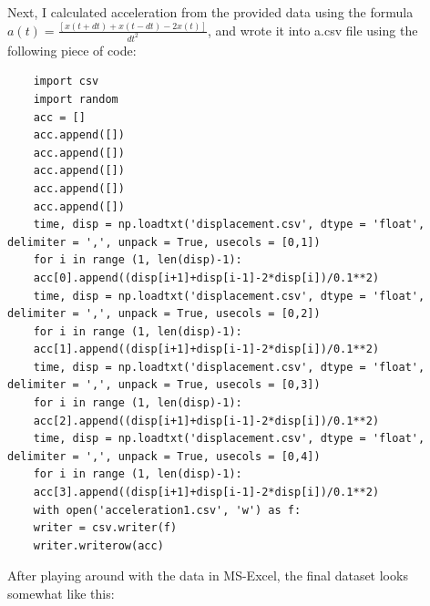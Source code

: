 \documentclass{article}
\begin{document}
\pagebreak

Next, I calculated acceleration from the provided data using the formula $a(t) = \frac{[x(t+dt) + x(t-dt) - 2 x(t)]}{dt^2}$, and wrote it into a.csv file using the following piece of code:

\begin{lstlisting}
	import csv
	import random
	acc = []
	acc.append([])
	acc.append([])
	acc.append([])
	acc.append([])
	acc.append([])
	time, disp = np.loadtxt('displacement.csv', dtype = 'float', delimiter = ',', unpack = True, usecols = [0,1])
	for i in range (1, len(disp)-1):
	acc[0].append((disp[i+1]+disp[i-1]-2*disp[i])/0.1**2)
	time, disp = np.loadtxt('displacement.csv', dtype = 'float', delimiter = ',', unpack = True, usecols = [0,2])
	for i in range (1, len(disp)-1):
	acc[1].append((disp[i+1]+disp[i-1]-2*disp[i])/0.1**2)
	time, disp = np.loadtxt('displacement.csv', dtype = 'float', delimiter = ',', unpack = True, usecols = [0,3])
	for i in range (1, len(disp)-1):
	acc[2].append((disp[i+1]+disp[i-1]-2*disp[i])/0.1**2)
	time, disp = np.loadtxt('displacement.csv', dtype = 'float', delimiter = ',', unpack = True, usecols = [0,4])
	for i in range (1, len(disp)-1):
	acc[3].append((disp[i+1]+disp[i-1]-2*disp[i])/0.1**2)
	with open('acceleration1.csv', 'w') as f:
	writer = csv.writer(f)
	writer.writerow(acc)
\end{lstlisting}

\pagebreak

After playing around with the data in MS-Excel, the final dataset looks somewhat like this: 
\end{document}
